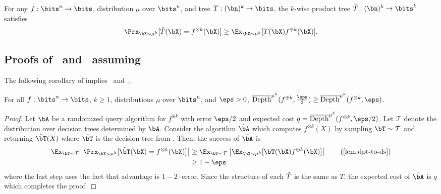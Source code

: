 \begin{lemma}
\label{lem:dpt-to-ds}
    For any $f:\bits^n \to \bits$, distribution $\mu$ over $\bits^n$, and tree $T:(\bn)^k \to \bits$, the $k$-wise product tree $\Tilde{T}:(\bn)^k \to \bits^k$ satisfies
    \begin{equation*}
        \Prx_{\bX \sim \mu^{k}}[\tilde{T}(\bX) = f^{\otimes k}(\bX)] \geq \Ex_{\bX \sim \mu^{k}}[T(\bX)f^{\oplus k}(\bX)].
    \end{equation*}
\end{lemma}



\subsection{Proofs of~ and~ assuming~}
The following corollary of  implies~ and~.
\begin{corollary}
    \label{cor:xor-to-dp-for-r}
    For all $f:\bits^n\to\bits$, $k\ge 1$, distributions $\mu$ over $\bits^n$, and $\eps>0$, $\overline{\mathrm{Depth}}^{\mu^{k}}(f^{\oplus k},\frac{\eps}{2})\ge \overline{\mathrm{Depth}}^{\mu^{k}}(f^{\otimes k},\eps)$.
\end{corollary}
\begin{proof}
    Let $\bA$ be a randomized query algorithm for $f^{\oplus k}$ with error $\eps/2$ and expected cost $q=\overline{\mathrm{Depth}}^{\mu^{k}}(f^{\oplus k},\eps/2)$. Let $\mathcal{T}$ denote the distribution over decision trees determined by $\bA$. Consider the algorithm $\Tilde{\bA}$ which computes $f^{\otimes k}(X)$ by sampling $\bT\sim\mathcal{T}$ and returning $\Tilde{\bT}(X)$ where $\Tilde{\bT}$ is the decision tree from . Then, the success of $\Tilde{\bA}$ is
    \begin{align*}
        \Ex_{\bT\sim \mathcal{T}}\left[\Prx_{\bX\sim \mu^{k}}[\Tilde{\bT}(\bX)=f^{\otimes k}(\bX)]\right]&\ge \Ex_{\bT\sim \mathcal{T}}\left[\Ex_{\bX\sim\mu^{k}}[\bT(\bX)f^{\oplus k}(\bX)]\right]\tag{\Cref{lem:dpt-to-ds}}\\
        &\ge 1-\eps
    \end{align*}
    where the last step uses the fact that advantage is $1-2\cdot\mathrm{error}$. Since the structure of each $\Tilde{T}$ is the same as $T$, the expected cost of $\Tilde{\bA}$ is $q$ which completes the proof.
\end{proof}

